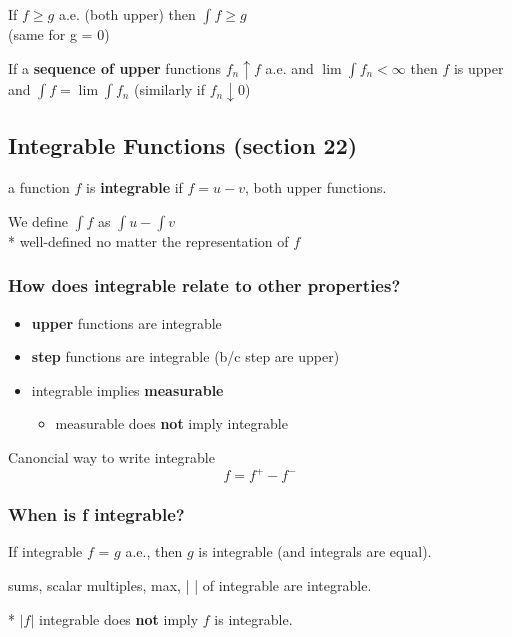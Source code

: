 \documentclass[a4paper, 12pt]{article}
\newcommand{\bt}[1]{\textbf{#1}} %
\newcommand{\gray}[1]{{\leavevmode\color[gray]{0.5}{#1}}} %
\begin{document}
\begin{multicols}{2}
If $f \geq g$ a.e. (both upper) then $\int f \geq g$\\
(same for g = 0)

If a \bt{sequence of upper} functions $f_n \uparrow f$ a.e. 
and $\lim \int f_n < \infty$ then $f$ is upper 
and $\int f = \lim \int f_n$
(similarly if $f_n \downarrow 0$)

\subsection{Integrable Functions (section 22)}


a function $f$ is \bt{integrable} if $f = u - v$, both upper functions.

We define $\int f$ as $\int u - \int v$\\
* well-defined no matter the representation of $f$

\subsubsection{How does integrable relate to other properties?}
\begin{itemize}
    \item \bt{upper} functions are integrable
    \item \bt{step} functions are integrable (b/c step are upper)
    \item integrable implies \bt{measurable}
        \begin{itemize}
            \item measurable does \bt{not} imply integrable\\
            \gray{e.g., constant functions are measurable, but only integrable
            when $\mu(X) < \infty$.}
        \end{itemize}
\end{itemize}

Canoncial way to write integrable 
$$f = f^+ - f^-$$
\gray{b/c: both $f^+$ and $f^-$ are upper if $f$ is integrable}

\subsubsection{When is f integrable?}

If integrable $f$ = $g$ a.e., then $g$ is integrable (and integrals are equal).

sums, scalar multiples, max, | | of integrable are integrable.

* $|f|$ integrable does \bt{not} imply $f$ is integrable.


\end{multicols}
\end{document}
